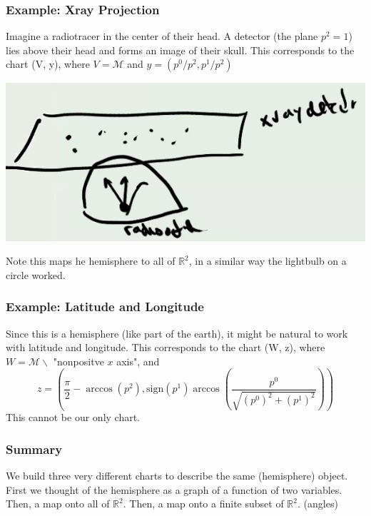 \documentclass[10pt]{article}
\newcommand{\R}{\mathbb{R}}
\begin{document}
\subsubsection*{Example: Xray Projection}
Imagine a radiotracer in the center of their head.  A detector (the plane $p^2 = 1$) lies above their head and forms an image of their skull.  This corresponds to the chart (V, y), where $V = \mathcal{M}$ and $y = (p^0 / p^2, p^1 / p^2)$
\begin{center}
    \includegraphics*[scale=0.8]{W4_5.png}
\end{center}
Note this maps he hemisphere to all of $\mathbb{R}^2$, in a similar way the lightbulb on a circle worked.

\subsubsection*{Example: Latitude and Longitude}
Since this is a hemisphere (like part of the earth), it might be natural to work with latitude and longitude.  This corresponds to the chart (W, z), where $W = \mathcal{M} \backslash$ "nonpositve $x$ axis", and 
\[z = \left(\frac{\pi}{2} - \arccos(p^2), \text{sign}(p^1) \arccos(\frac{p^0}{\sqrt{(p^0)^2 + (p^1)^2}})\right)\]
This cannot be our only chart.

\subsubsection*{Summary}
We build three very different charts to describe the same (hemisphere) object.  First we thought of the hemisphere as a graph of a function of two variables.  Then, a map onto all of $\R^2$.  Then, a map onto a finite subset of $\R^2$.  (angles)
\end{document}
